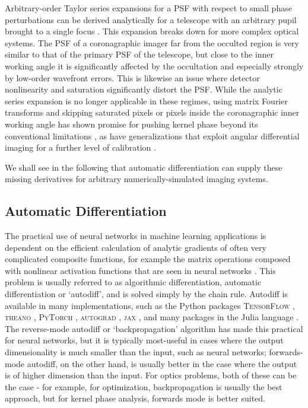 \documentclass[modern]{aastex63}
\begin{document}
Arbitrary-order Taylor series expansions for a PSF with respect to small phase perturbations can be derived analytically for a telescope with an arbitrary pupil brought to a single focus \citep{bloemhof01,anand02,perrin03}. This expansion breaks down for more complex optical systems. The PSF of a coronagraphic imager far from the occulted region is very similar to that of the primary PSF of the telescope, but close to the inner working angle it is significantly affected by the occultation and especially strongly by low-order wavefront errors. This is likewise an issue where detector nonlinearity and saturation significantly distort the PSF. While the analytic series expansion is no longer applicable in these regimes, using matrix Fourier transforms and skipping saturated pixels or pixels inside the coronagraphic inner working angle has shown promise for pushing kernel phase beyond its conventional limitations \citep{laugier19b}, as have generalizations that exploit angular differential imaging for a further level of calibration \citep{laugier20}.

We shall see in the following that automatic differentiation can supply these missing derivatives for arbitrary numerically-simulated imaging systems.

\subsection{Automatic Differentiation}
The practical use of neural networks in machine learning applications is dependent on the efficient calculation of analytic gradients of often very complicated composite functions, for example the matrix operations composed with nonlinear activation functions that are seen in neural networks \citep{lecun15}. This problem is usually referred to as algorithmic differentiation, automatic differentiation or `autodiff', and is solved simply by the chain rule.
Autodiff is available in many implementations, such as the Python packages \textsc{TensorFlow} \citep{tensorflow2015}, \textsc{theano} \citep{theano}, \textsc{PyTorch} \citep{pytorch}, \textsc{autograd} \citep{autograd}, \textsc{jax} \citep{jax}, and many packages in the Julia language \citep{julia}. The reverse-mode autodiff or `backpropagation' algorithm \citep{linnainmaa1970,lecun1988theoretical} has made this practical for neural networks, but it is typically most-useful in cases where the output dimensionality is much smaller than the input, such as neural networks; forwards-mode autodiff, on the other hand, is usually better in the case where the output is of higher dimension than the input. For optics problems, both of these can be the case - for example, for optimization, backpropagation is usually the best approach, but for kernel phase analysis, forwards mode is better suited.
\end{document}
